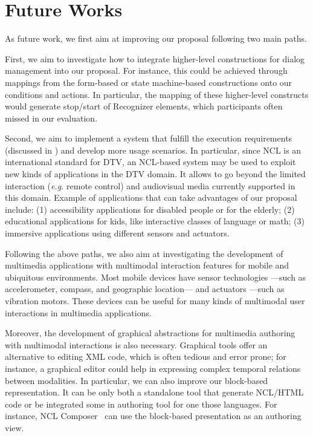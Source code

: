 \section{Future Works}
\label{sec:future}

As future work, we first aim at improving our proposal following two main paths.

First, we aim to investigate how to integrate higher-level constructions for
dialog management into our proposal. For instance, this could be achieved
through mappings from the form-based or state machine-based constructions onto
our conditions and actions. In particular, the mapping of these higher-level
constructs would generate stop/start of Recognizer elements, which participants
often missed in our evaluation.

Second, we aim to implement a system that fulfill the execution requirements
(discussed in ) and develop more usage scenarios. In
particular, since NCL is an international standard for DTV, an NCL-based system
may be used to exploit new kinds of applications in the DTV domain. It allows
to go beyond the limited interaction (\textit{e.g.} remote control) and
audiovisual media currently supported in this domain. Example of applications
that can take advantages of our proposal include: (1) accessibility
applications for disabled people or for the elderly; (2) educational
applications for kids, like interactive classes of language or math; (3)
immersive applications using different sensors and actuators.

Following the above paths, we also aim at investigating the development of
multimedia applications with multimodal interaction features for mobile and
ubiquitous environments. Most mobile devices have sensor technologies —such as
accelerometer, compass, and geographic location— and actuators —such as
vibration motors. These devices can be useful for many kinds of multimodal user
interactions in multimedia applications.

Moreover, the development of graphical abstractions for multimedia authoring
with multimodal interactions is also necessary. Graphical tools offer an
alternative to editing XML code, which is often tedious and error prone; for
instance, a graphical editor could help in expressing complex temporal relations
between modalities. In particular, we can also improve our block-based
representation. It can be only both a standalone tool that generate NCL/HTML
code or be integrated some in authoring tool for one those languages. For
instance, NCL Composer~\cite{azevedo_composer:_2014} can use the block-based
presentation as an authoring view.
